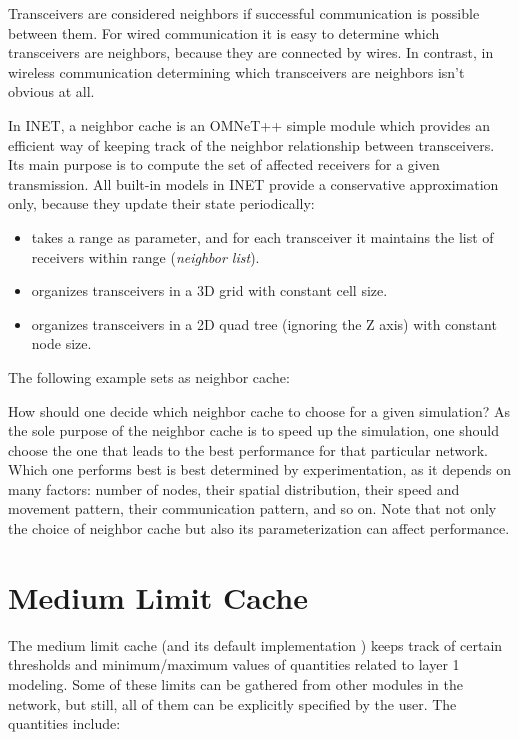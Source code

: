 Transceivers are considered neighbors if successful communication is
possible between them. For wired communication it is easy to determine
which transceivers are neighbors, because they are connected by wires. In
contrast, in wireless communication determining which transceivers are
neighbors isn't obvious at all.

In INET, a neighbor cache is an OMNeT++ simple module which provides
an efficient way of keeping track of the neighbor relationship between
transceivers. Its main purpose is to compute the set of affected receivers
for a given transmission. All built-in models in INET provide a
conservative approximation only, because they update their state
periodically:

\begin{itemize}
  \item {} takes a range as parameter,
    and for each transceiver it maintains the list of receivers within
    range (\textit{neighbor list}).
  \item {} organizes transceivers in a 3D grid with
    constant cell size.
  \item {} organizes transceivers in a 2D quad tree
    (ignoring the Z axis) with constant node size.
\end{itemize}

The following example sets  as neighbor cache:


How should one decide which neighbor cache to choose for a given simulation?
As the sole purpose of the neighbor cache is to speed up the simulation,
one should choose the one that leads to the best performance for that particular
network. Which one performs best is best determined by experimentation, as it
depends on many factors: number of nodes, their spatial distribution, their
speed and movement pattern, their communication pattern, and so on.
Note that not only the choice of neighbor cache but also its parameterization
can affect performance.


\section{Medium Limit Cache}
\label{sec:medium:medium-limit-cache}

The medium limit cache (and its default implementation )
keeps track of certain thresholds and minimum/maximum values of quantities
related to layer 1 modeling. Some of these limits can be gathered from other
modules in the network, but still, all of them can be explicitly specified by the user.
The quantities include:

